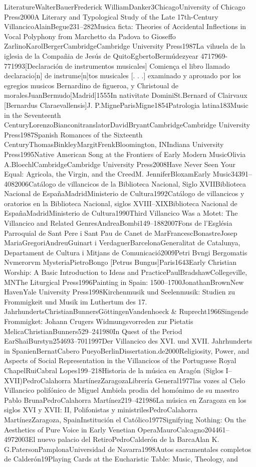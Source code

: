 \documentclass{memoir}
\begin{document}
{{{{{{{{LiteratureWalterBauerFrederick WilliamDanker3ChicagoUniversity of Chicago Press2000A Literary and Typological Study of the Late 17th-Century VillancicoAlainBegue231–282Musica ficta: Theories of Accidental Inflections in Vocal Polyphony from Marchetto da Padova to Gioseffo ZarlinoKarolBergerCambridgeCambridge University Press1987La vihuela de la iglesia de la Compañia de Jesús de QuitoEgbertoBermúdezyear 4717969-771993[Declaración de instrumentos musicales] Comiença el libro llamado declaracio[n] de instrume[n]tos musicales [. . .] examinado y aprouado por los egregios musicos Bernardino de figueroa, y Christoual de moralesJuanBermudo[Madrid]1555In nativitate DominiSt.Bernard of Clairvaux [Bernardus Claraevallensis]J. P.MigneParisMigne1854Patrologia latina183Music in the Seventeenth CenturyLorenzoBianconitranslatorDavidBryantCambridgeCambridge University Press1987Spanish Romances of the Sixteenth CenturyThomasBinkleyMargitFrenkBloomington, INIndiana University Press1995Native American Song at the Frontiers of Early Modern MusicOlivia A.BloechlCambridgeCambridge University Press2008\mkbibquoteI Have Never Seen Your Equal: Agricola, the Virgin, and the CreedM. JenniferBloxamEarly Music34391–4082006Catálogo de villancicos de la Biblioteca Nacional, Siglo XVIIBiblioteca Nacional de EspañaMadridMinisterio de Cultura1992Catálogo de villancicos y oratorios en la Biblioteca Nacional, siglos XVIII–XIXBiblioteca Nacional de EspañaMadridMinisterio de Cultura1990\mkbibquoteThe Third Villancico Was a Motet: The Villancico and Related GenresAndreaBombi149–1882007Fons de l'Església Parroquial de Sant Pere i Sant Pau de Canet de MarFrancescBonastreJosep MariaGregoriAndreuGuinart i VerdaguerBarcelonaGeneralitat de Catalunya, Departament de Cultura i Mitjans de Comunicació2009Petri Bvngi Bergomatis Nvmerorvm MysteriaPietroBongo [Petrus Bungus]Paris1643Early Christian Worship: A Basic Introduction to Ideas and PracticePaulBradshawCollegeville, MNThe Liturgical Press1996Painting in Spain: 1500–1700JonathanBrownNew HavenYale University Press1998Kirchenmusik und Seelenmusik: Studien zu Frommigkeit und Musik im Luthertum des 17. JahrhundertsChristianBunnersGöttingenVandenhoeck & Ruprecht1966Singende Frommigket: Johann Crugers Widmungsvorreden zur \mkbibquotePraxis Pietatis MelicaChristianBunners529–241980In Quest of the Period EarShaiBurstyn254693–7011997Der Villancico des XVI. und XVII. Jahrhunderts in SpanienBernatCabero PueyoBerlinDissertation.de2000Religiosity, Power, and Aspects of Social Representation in the Villancicos of the Portuguese Royal ChapelRuiCabral Lopes199–218Historia de la música en Aragón (Siglos I–XVII)PedroCalahorra MartínezZaragozaLibrería General1977\mkbibquoteSuban las vozes al Cielo Villancico polifónico de Miguel Ambiela prodia del homónimo de su maestro Pablo BrunaPedroCalahorra Martínez219–421986La música en Zaragoza en los siglos XVI y XVII: II, Polifonistas y ministrilesPedroCalahorra MartínezZaragoza, SpainInstitución \mkbibquoteFernando el Católico1977Signifying Nothing: On the Aesthetics of Pure Voice in Early Venetian OperaMauroCalcagno204461–4972003El nuevo palacio del RetiroPedroCalderón de la BarcaAlan K. G.PatersonPamplonaUniversidad de Navarra1998Autos sacramentales completos de Calderón19Playing Cards at the Eucharistic Table: Music, Theology, and }}}}}}}}
\end{document}
